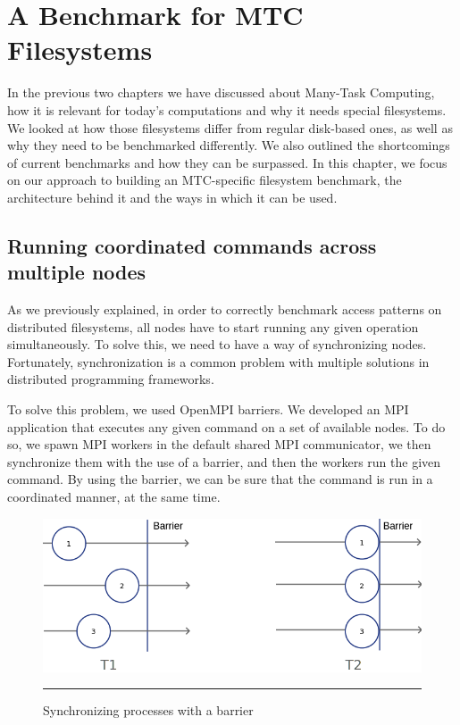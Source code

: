 
\chapter{A Benchmark for MTC Filesystems} %

\label{Chapter3} %


In the previous two chapters we have discussed about Many-Task Computing, how it is relevant for today's  computations and why it needs special filesystems. We looked at how those filesystems differ from regular disk-based ones, as well as why they need to be benchmarked differently. We also outlined the shortcomings of current benchmarks and how they can be surpassed. In this chapter, we focus on our approach to building an MTC-specific filesystem benchmark, the architecture behind it and the ways in which it can be used.

\section{Running coordinated commands across multiple nodes}\label{sec:coordination}

As we previously explained, in order to correctly benchmark access patterns on distributed filesystems, all nodes have to start running any given operation simultaneously. To solve this, we need to have a way of synchronizing nodes. Fortunately, synchronization is a common problem with multiple solutions in distributed programming frameworks.

To solve this problem, we used OpenMPI\cite{openmpi} barriers. We developed an MPI application that executes any given command on a set of available nodes. To do so, we spawn MPI workers in the default shared MPI communicator, we then synchronize them with the use of a barrier, and then the workers run the given command. By using the barrier, we can be sure that the command is run in a coordinated manner, at the same time.


\begin{figure}[H]
  \centering
    \includegraphics[scale=0.5]{Figures/barrier.png}
    \rule{25em}{0.5pt}
  \caption[MPI barrier]{Synchronizing processes with a barrier}
  \label{fig:barrier}
\end{figure}


